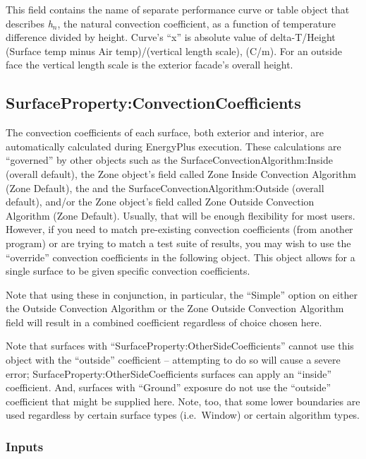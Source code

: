This field contains the name of separate performance curve or table object that describes \emph{h\(_{n}\)}, the natural convection coefficient, as a function of temperature difference divided by height. Curve's ``x'' is absolute value of delta-T/Height (Surface temp minus Air temp)/(vertical length scale), (C/m). For an outside face the vertical length scale is the exterior facade's overall height.

\subsection{SurfaceProperty:ConvectionCoefficients}\label{surfacepropertyconvectioncoefficients}

The convection coefficients of each surface, both exterior and interior, are automatically calculated during EnergyPlus execution. These calculations are ``governed'' by other objects such as the SurfaceConvectionAlgorithm:Inside (overall default), the Zone object's field called Zone Inside Convection Algorithm (Zone Default), the and the SurfaceConvectionAlgorithm:Outside (overall default), and/or the Zone object's field called Zone Outside Convection Algorithm (Zone Default). Usually, that will be enough flexibility for most users. However, if you need to match pre-existing convection coefficients (from another program) or are trying to match a test suite of results, you may wish to use the ``override'' convection coefficients in the following object. This object allows for a single surface to be given specific convection coefficients.

Note that using these in conjunction, in particular, the ``Simple'' option on either the Outside Convection Algorithm or the Zone Outside Convection Algorithm field will result in a combined coefficient regardless of choice chosen here.

\begin{callout}
Note that surfaces with ``SurfaceProperty:OtherSideCoefficients'' cannot use this object with the ``outside'' coefficient -- attempting to do so will cause a severe error; SurfaceProperty:OtherSideCoefficients surfaces can apply an ``inside'' coefficient. And, surfaces with ``Ground'' exposure do not use the ``outside'' coefficient that might be supplied here. Note, too, that some lower boundaries are used regardless by certain surface types (i.e.~Window) or certain algorithm types.
\end{callout}

\subsubsection{Inputs}\label{inputs-10}

